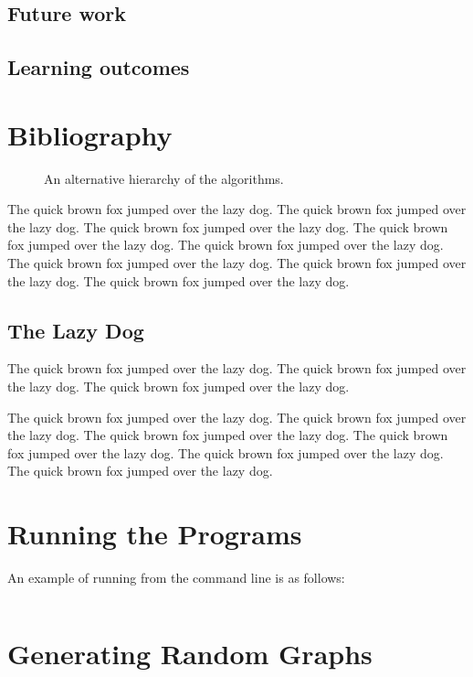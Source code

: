 \documentclass{l4proj}
\begin{document}
\section{Future work}

\section{Learning outcomes}

\chapter{Bibliography}

\begin{figure}
\centering
\vspace{-30mm}
\caption{An alternative hierarchy of the algorithms.}
\label{uroborus}
\end{figure}

The quick brown fox jumped over the lazy dog.
The quick brown fox jumped over the lazy dog.
The quick brown fox jumped over the lazy dog.
The quick brown fox jumped over \cite{ckt} the lazy dog.
The quick brown fox jumped over the lazy dog.
The quick brown fox jumped over the lazy dog.
The quick brown fox jumped over the lazy dog.
The quick brown fox jumped over the lazy dog.

\section{The Lazy Dog}
The quick brown fox jumped over the lazy dog.
The quick brown fox jumped over the lazy dog.
The quick brown fox jumped over the lazy dog.

The quick brown fox jumped over the lazy dog.
The quick brown fox \cite{am97} jumped over the lazy dog.
The quick brown fox jumped over the lazy dog.
The quick brown fox jumped over the lazy dog.
The quick brown fox jumped over the lazy dog.
The quick brown fox jumped over the lazy dog.

\begin{appendices}

\chapter{Running the Programs}
An example of running from the command line is as follows:
\begin{verbatim}
\end{verbatim}


\chapter{Generating Random Graphs}
\label{sec:randomGraph}

\begin{verbatim}
\end{verbatim}
\end{appendices}




\end{document}

